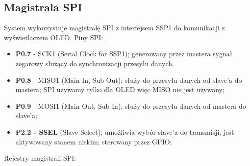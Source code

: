 \subsection{Magistrala SPI}
System wykorzystuje magistralę SPI z interfejsem SSP1 do komunikacji z wyświetlaczem OLED. 
Piny SPI:
\begin{itemize}
\item \textbf{P0.7} - SCK1 (Serial Clock for SSP1); generowany przez mastera sygnał zegarowy służący do synchronizacji przesyłu danych.
\item \textbf{P0.8} - MISO1 (Main In, Sub Out); służy do przesyłu danych od slave'a do mastera; SPI używamy tylko dla OLED więc MISO nie jest używany;
\item \textbf{P0.9} - MOSI1 (Main Out, Sub In); służy do przesyłu danych od mastera do slave'a;
\item \textbf{P2.2 - SSEL} (Slave Select); umożliwia wybór slave’a do transmisji, jest aktywowany stanem niskim; sterowany przez GPIO;
\end{itemize}
Rejestry magistrali SPI:
